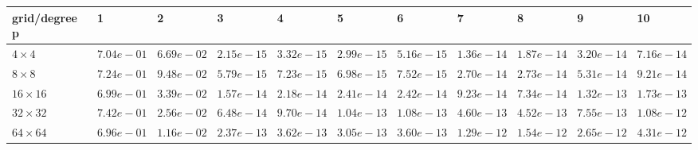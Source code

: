 \begin{tabular}{lllllllllll}
\hline
 grid/degree p   & 1          & 2          & 3          & 4          & 5          & 6          & 7          & 8          & 9          & 10         \\
\hline
 $4 \times 4$    & $7.04e-01$ & $6.69e-02$ & $2.15e-15$ & $3.32e-15$ & $2.99e-15$ & $5.16e-15$ & $1.36e-14$ & $1.87e-14$ & $3.20e-14$ & $7.16e-14$ \\
 $8 \times 8$    & $7.24e-01$ & $9.48e-02$ & $5.79e-15$ & $7.23e-15$ & $6.98e-15$ & $7.52e-15$ & $2.70e-14$ & $2.73e-14$ & $5.31e-14$ & $9.21e-14$ \\
 $16 \times 16$  & $6.99e-01$ & $3.39e-02$ & $1.57e-14$ & $2.18e-14$ & $2.41e-14$ & $2.42e-14$ & $9.23e-14$ & $7.34e-14$ & $1.32e-13$ & $1.73e-13$ \\
 $32 \times 32$  & $7.42e-01$ & $2.56e-02$ & $6.48e-14$ & $9.70e-14$ & $1.04e-13$ & $1.08e-13$ & $4.60e-13$ & $4.52e-13$ & $7.55e-13$ & $1.08e-12$ \\
 $64 \times 64$  & $6.96e-01$ & $1.16e-02$ & $2.37e-13$ & $3.62e-13$ & $3.05e-13$ & $3.60e-13$ & $1.29e-12$ & $1.54e-12$ & $2.65e-12$ & $4.31e-12$ \\
\hline
\end{tabular}